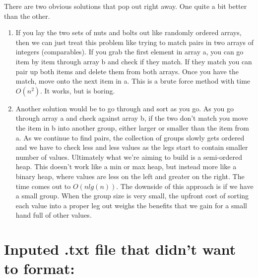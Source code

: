\documentclass[11pt]{article}
\begin{document}
There are two obvious solutions that pop out right away. One quite a bit better than the other. 

\begin{enumerate}
    \item If you lay the two sets of nuts and bolts out like randomly ordered arrays, then we can just treat this problem like trying to match pairs in two arrays of integers (comparables). If you grab the first element in array a, you can go item by item through array b and check if they match. If they match you can pair up both items and delete them from both arrays. Once you have the match, move onto the next item in a. This is a brute force method with time $O(n^2)$. It works, but is boring.
    \item Another solution would be to go through and sort as you go. As you go through array a and check against array b, if the two don't match you move the item in b into another group, either larger or smaller than the item from a. As we continue to find pairs, the collection of groups slowly gets ordered and we have to check less and less values as the legs start to contain smaller number of values. Ultimately what we're aiming to build is a semi-ordered heap. This doesn't work like a min or max heap, but instead more like a binary heap, where values are less on the left and greater on the right. The time comes out to $O(n lg(n))$. The downside of this approach is if we have a small group. When the group size is very small, the upfront cost of sorting each value into a proper leg out weighs the benefits that we gain for a small hand full of other values. 
\end{enumerate}

\newpage
\section*{Inputed .txt file that didn't want to format:}

\end{document}
